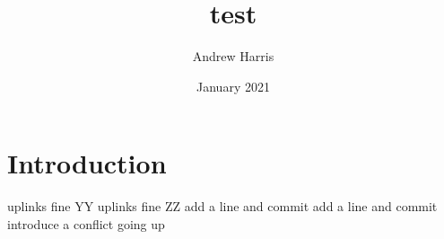 \documentclass{article}
\title{test}
\author{Andrew Harris}
\date{January 2021}
\begin{document}
\maketitle

\section{Introduction}
uplinks fine YY
uplinks fine ZZ
add a line and commit
add a line and commit
introduce a conflict going up
\end{document}
